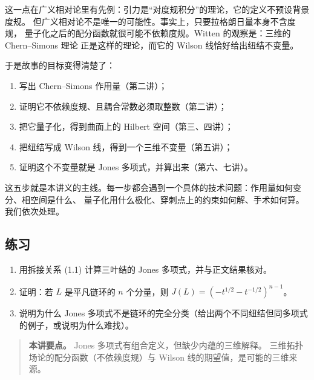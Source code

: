 这一点在广义相对论里有先例：引力是“对度规积分”的理论，它的定义不预设背景度规。
但广义相对论不是唯一的可能性。事实上，只要拉格朗日量本身不含度规，
量子化之后的配分函数就很可能不依赖度规。Witten 的观察是：三维的 Chern--Simons 理论
正是这样的理论，而它的 Wilson 线恰好给出纽结不变量。

于是故事的目标变得清楚了：
\begin{enumerate}[leftmargin=*]
  \item 写出 Chern--Simons 作用量（第二讲）；
  \item 证明它不依赖度规、且耦合常数必须取整数（第二讲）；
  \item 把它量子化，得到曲面上的 Hilbert 空间（第三、四讲）；
  \item 把纽结写成 Wilson 线，得到一个三维不变量（第五讲）；
  \item 证明这个不变量就是 Jones 多项式，并算出来（第六、七讲）。
\end{enumerate}

这五步就是本讲义的主线。每一步都会遇到一个具体的技术问题：作用量如何变分、相空间是什么、
量子化用什么极化、穿刺点上的约束如何解、手术如何算。我们依次处理。

\subsection*{练习}
\begin{enumerate}[leftmargin=*]
  \item 用拆接关系 (1.1) 计算三叶结的 Jones 多项式，并与正文结果核对。
  \item 证明：若 $L$ 是平凡链环的 $n$ 个分量，则 $J(L)=(-t^{1/2}-t^{-1/2})^{n-1}$。
  \item 说明为什么 Jones 多项式不是链环的完全分类（给出两个不同纽结但同多项式的例子，或说明为什么难找）。
\end{enumerate}

\begin{quote}
\small
\textbf{本讲要点。} Jones 多项式有组合定义，但缺少内蕴的三维解释。
三维拓扑场论的配分函数（不依赖度规）与 Wilson 线的期望值，是可能的三维来源。
\end{quote}
